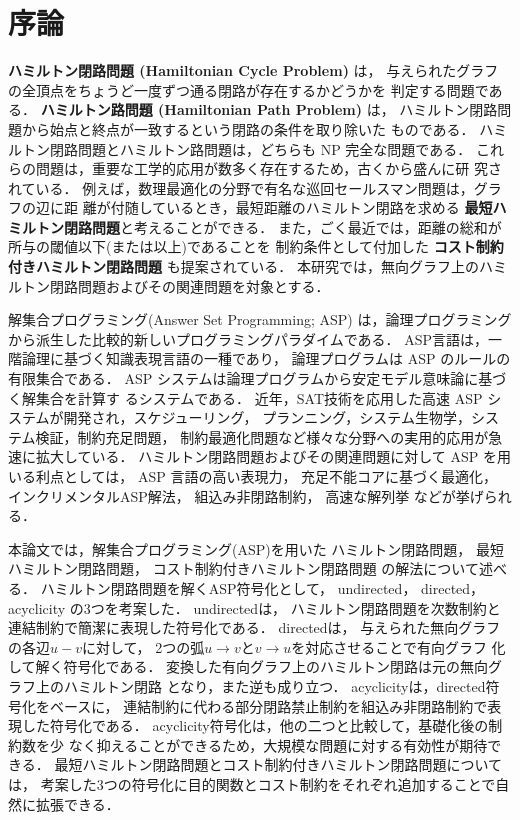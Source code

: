 ﻿%
\section{序論}

\textbf{ハミルトン閉路問題 (Hamiltonian Cycle Problem)} は，
与えられたグラフの全頂点をちょうど一度ずつ通る閉路が存在するかどうかを
判定する問題である\cite{hirata15:book}．
\textbf{ハミルトン路問題 (Hamiltonian Path Problem)} は，
ハミルトン閉路問題から始点と終点が一致するという閉路の条件を取り除いた
ものである．
ハミルトン閉路問題とハミルトン路問題は，どちらも NP 完全な問題である．
これらの問題は，重要な工学的応用が数多く存在するため，古くから盛んに研
究されている．
例えば，数理最適化の分野で有名な巡回セールスマン問題は，グラフの辺に距
離が付随しているとき，最短距離のハミルトン閉路を求める
\textbf{最短ハミルトン閉路問題}と考えることができる．
また，ごく最近では，距離の総和が所与の閾値以下(または以上)であることを
制約条件として付加した
\textbf{コスト制約付きハミルトン閉路問題}
も提案されている\cite{comp20:Minato}．
本研究では，無向グラフ上のハミルトン閉路問題およびその関連問題を対象とする．

解集合プログラミング(Answer Set Programming; ASP\cite{%
  Baral03:cambridge,%
  Gelfond88:iclp,%
  Inoue08:jssst,%
  Niemela99:amai})
は，論理プログラミングから派生した比較的新しいプログラミングパラダイムである．
ASP言語は，一階論理に基づく知識表現言語の一種であり，
論理プログラムは ASP のルールの有限集合である．
ASP システムは論理プログラムから安定モデル意味論に基づく解集合を計算す
るシステムである．
近年，SAT技術を応用した高速 ASP システムが開発され，スケジューリング，
プランニング，システム生物学，システム検証，制約充足問題，
制約最適化問題など様々な分野への実用的応用が急速に拡大している．
ハミルトン閉路問題およびその関連問題に対して ASP を用いる利点としては，
ASP 言語の高い表現力，
充足不能コアに基づく最適化，
インクリメンタルASP解法，
組込み非閉路制約，
高速な解列挙
などが挙げられる．

本論文では，解集合プログラミング(ASP)を用いた
ハミルトン閉路問題，
最短ハミルトン閉路問題，
コスト制約付きハミルトン閉路問題
の解法について述べる．
%
ハミルトン閉路問題を解くASP符号化として，
\textsf{undirected}，
\textsf{directed}，
\textsf{acyclicity}
の3つを考案した．
\textsf{undirected}は，
ハミルトン閉路問題を次数制約と連結制約で簡潔に表現した符号化である．
\textsf{directed}は，
与えられた無向グラフの各辺$u-v$に対して，
2つの弧$u\rightarrow v$と$v\rightarrow u$を対応させることで有向グラフ
化して解く符号化である．
変換した有向グラフ上のハミルトン閉路は元の無向グラフ上のハミルトン閉路
となり，また逆も成り立つ．
\textsf{acyclicity}は，\textsf{directed}符号化をベースに，
連結制約に代わる部分閉路禁止制約を組込み非閉路制約で表現した符号化である．
\textsf{acyclicity}符号化は，他の二つと比較して，基礎化後の制約数を少
なく抑えることができるため，大規模な問題に対する有効性が期待できる．
最短ハミルトン閉路問題とコスト制約付きハミルトン閉路問題については，
考案した3つの符号化に目的関数とコスト制約をそれぞれ追加することで自然に拡張できる．

